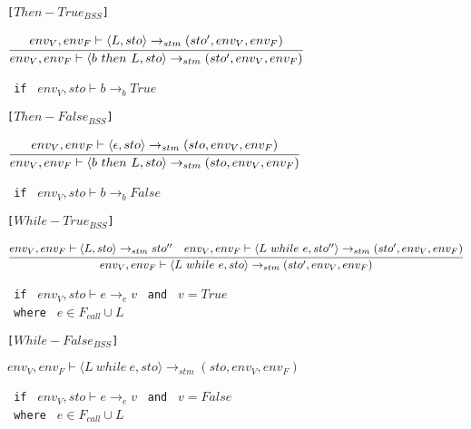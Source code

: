 \texttt{[$Then-True_{BSS}$]}\\
\begin{center}
	\begin{math}
		\cfrac
			{env_V, env_F \vdash \langle L,sto \rangle \rightarrow_{stm} (sto', env_V, env_F)}
			{env_V, env_F \vdash \langle b\ then\ L, sto \rangle \rightarrow_{stm} (sto', env_V, env_F)}
	\end{math}
	
	\texttt{ if } $env_V, sto \vdash b \rightarrow_b True$
\end{center}

\texttt{[$Then-False_{BSS}$]}\\
\begin{center}
	\begin{math}
	\cfrac
	{env_V, env_F \vdash \langle \epsilon,sto \rangle \rightarrow_{stm} (sto, env_V, env_F)}
	{env_V, env_F \vdash \langle b\ then\ L, sto \rangle \rightarrow_{stm} (sto, env_V, env_F)}
	\end{math}
	
	\texttt{ if } $env_V, sto \vdash b \rightarrow_b False$
\end{center}

\texttt{[$While-True_{BSS}$]}\\
\begin{center}
	\begin{math}
		\cfrac
			{env_V, env_F \vdash \langle L, sto \rangle \rightarrow_{stm} sto'' \quad env_V, env_F \vdash \langle L\ while\ e, sto'' \rangle \rightarrow_{stm} (sto', env_V, env_F)}
			{env_V, env_F \vdash \langle L\ while\ e, sto \rangle \rightarrow_{stm} (sto', env_V, env_F)}
	\end{math}
	
	\texttt{ if } $env_V, sto \vdash e \rightarrow_e v$
	\texttt{ and } $v = True$\\
	\texttt{ where } $e \in F_{call} \cup L$
\end{center}

\texttt{[$While-False_{BSS}$]}\\
\begin{center}
	\begin{math}
	{env_V, env_F \vdash \langle L\ while\ e, sto \rangle \rightarrow_{stm} (sto, env_V, env_F)}
	\end{math}
	
	\texttt{ if } $env_V, sto \vdash e \rightarrow_e v$
	\texttt{ and } $v = False$\\
	\texttt{ where } $e \in F_{call} \cup L$
\end{center}

